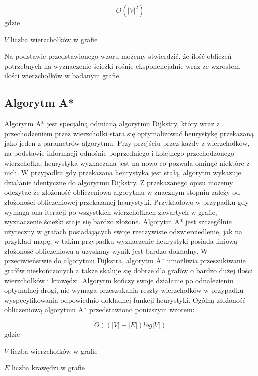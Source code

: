 \begin{equation}
O(|V|^2)
\end{equation}
gdzie
\begin{eqwhere}[2cm]
	\item[$V$] liczba wierzchołków w grafie 
\end{eqwhere}

Na podstawie przedstawionego wzoru możemy stwierdzić, że ilość obliczeń potrzebnych na wyznaczenie ścieżki rośnie eksponencjalnie wraz ze wzrostem ilości wierzchołków w badanym grafie.

\subsection{Algorytm A*}

Algorytm A* jest specjalną odmianą algorytmu Dijkstry, który wraz z przechodzeniem przez wierzchołki stara się optymalizować heurystykę przekazaną jako jeden z parametrów algorytmu. Przy przejściu przez każdy z wierzchołków, na podstawie informacji odnośnie poprzedniego i kolejnego przechodzonego wierzchołka, heurystyka wyznaczana jest na nowo co pozwala ominąć niektóre z nich. W przypadku gdy przekazana heurystyka jest stałą, algorytm wykazuje działanie identyczne do algorytmu Dijkstry. Z przekazanego opisu możemy odczytać że złożoność obliczeniowa algorytmu w znacznym stopniu zależy od złożoności obliczeniowej przekazanej heurystyki. Przykładowo w przypadku gdy wymaga ona iteracji po wszystkich wierzchołkach zawartych w grafie, wyznaczenie ścieżki staje się bardzo złożone. Algorytm A* jest szczególnie użyteczny w grafach posiadających swoje rzeczywiste odzwierciedlenie, jak na przykład mapę, w takim przypadku wyznaczenie heurystyki posiada liniową złożoność obliczeniową a uzyskany wynik jest bardzo dokładny.
W przeciwieństwie do algorytmu Dijkstra, algorytm A* umożliwia przeszukiwanie grafów nieskończonych a także skaluje się dobrze dla grafów o bardzo dużej ilości wierzchołków i krawędzi. Algorytm kończy swoje działanie po odnalezieniu optymalnej drogi, nie wymaga przeszukania reszty wierzchołków w przypadku wyspecyfikowania odpowiednio dokładnej funkcji heurystyki. Ogólną złożoność obliczeniową algorytmu A* przedstawiono poniższym wzorem:\newline

\begin{equation}
O((|V| + |E|) log |V|)
\end{equation}
gdzie
\begin{eqwhere}[2cm]
	\item[$V$] liczba wierzchołków w grafie 
	\item[$E$] liczba krawędzi w grafie 
\end{eqwhere}

